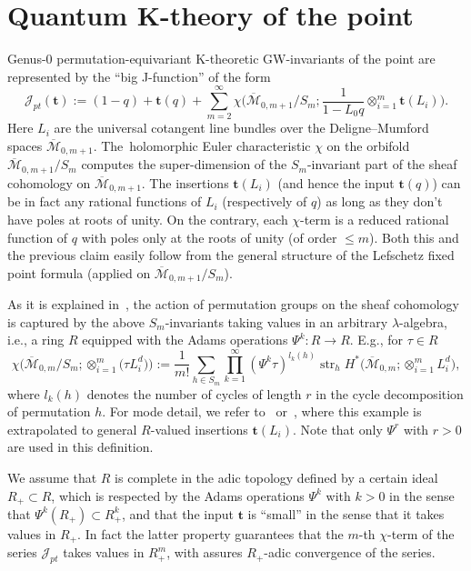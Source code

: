 \documentclass[pdftex]{sigma}
\numberwithin{equation}{section}
\def\J{\mathcal J}
\def\M{{\overline{\mathcal M}}}
\def\t{{\mathbf t}}
\def\str{\operatorname{str}}
\def\str{\operatorname{str}}
\begin{document}
\section{Quantum K-theory of the point}
\label{Sec3}

Genus-0 permutation-equivariant K-theoretic GW-invariants of the point are represented by the ``big J-function'' of the form
\[
\J_{pt}(\t):=(1-q)+\t(q)+\sum_{m=2}^{\infty}\chi
\bigg(\M_{0,m+1}/S_m; \frac{1}{1-L_0q}\otimes_{i=1}^m \t(L_i)\bigg).
\]
Here $L_i$ are the universal cotangent line bundles over the Deligne--Mumford spaces $\M_{0,m+1}$. The~holomorphic Euler characteristic $\chi$ on the orbifold $\M_{0,m+1}/S_m$ computes the super-dimen\-sion of the $S_m$-invariant part of the sheaf cohomology on $\M_{0,m+1}$. The insertions $\t(L_i)$ (and hence the input $\t(q)$) can be in fact any rational functions of $L_i$ (respectively of $q$) as long as they don't have poles at roots of unity. On the contrary, each $\chi$-term is a reduced rational function of $q$ with poles only at the roots of unity (of order $\leq m$). Both this and the previous claim easily follow from the general structure of the Lefschetz fixed point formula (applied on $\M_{0,m+1}/S_m$).

As it is explained in~\cite{Givental:perm1, Givental:perm9}, the action of permutation groups on the sheaf cohomology is captured by the above $S_m$-invariants taking values in an arbitrary $\lambda$-algebra, i.e., a ring $R$ equipped with the Adams operations $\Psi^k\colon R\to R$. E.g., for $\tau\in R$
\[
\chi\big(\M_{0,m}/S_m;\otimes_{i=1}^m \big(\tau L_i^d\big)\big) := \frac{1}{m!} \sum_{h\in S_m}\prod_{k=1}^{\infty} (\Psi^k\tau)^{l_k(h)} \str_h H^*\big(\M_{0,m};\otimes_{i=1}^mL_i^d\big),
\]
where $l_k(h)$ denotes the number of cycles of length $r$ in the cycle decomposition of permutation $h$. For mode detail, we refer to~\cite{Givental:perm1} or~\cite{Givental:perm9}, where this example is
extrapolated to general $R$-valued insertions $\t(L_i)$. Note that only $\Psi^r$ with $r>0$ are used in this definition.

We assume that $R$ is complete in the adic topology defined by a certain ideal $R_{+}\subset R$, which is respected by the Adams operations $\Psi^k$ with $k>0$ in the sense that $\Psi^k(R_{+})\subset R_{+}^k$, and that the input $\t$ is ``small'' in the sense that it takes values in $R_{+}$. In fact the latter property guarantees that the $m$-th $\chi$-term of the series $\J_{pt}$ takes values in $R_{+}^m$, with assures $R_{+}$-adic convergence of the series.
\end{document}
